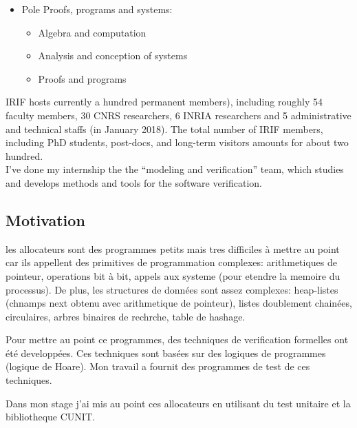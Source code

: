 \begin{itemize}
\item Pole Proofs, programs and systems:
\begin{itemize}
\item Algebra and computation
\end{itemize}
\begin{itemize}
\item Analysis and conception of systems 
\end{itemize}
\begin{itemize}
\item Proofs and programs
\end{itemize}

\end{itemize}
IRIF hosts currently a hundred permanent members), including roughly 54 faculty members, 30 CNRS researchers, 6 INRIA researchers and 5 administrative and technical staffs (in January 2018). The total number of IRIF members, including PhD students, post-docs, and long-term visitors amounts for about two hundred. \\

I've done my internship the the ``modeling and verification'' team, which studies and develops methods and tools for the software verification.


\subsection{Motivation}

les allocateurs sont des programmes petits mais tres difficiles à mettre au point car ils appellent des primitives de programmation complexes: arithmetiques de pointeur, operations bit à bit, appels aux systeme (pour etendre la memoire du processus). De plus, les structures de données sont assez complexes: heap-listes (chnamps next obtenu avec arithmetique de pointeur), listes doublement chainées, circulaires, arbres binaires de rechrche, table de hashage. 

Pour mettre au point ce programmes, des techniques de verification formelles ont été developpées. Ces techniques sont basées sur des logiques de programmes (logique de Hoare). Mon travail a fournit des programmes de test de ces techniques.


Dans mon stage j'ai mis au point ces allocateurs en utilisant du test unitaire et la  bibliotheque CUNIT.
